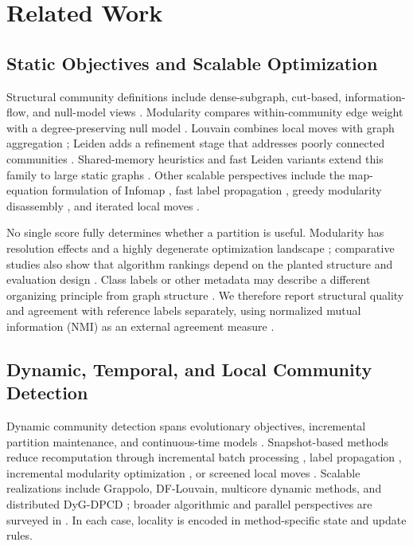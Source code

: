 \documentclass{ieeeaccess}
\begin{document}
\section{Related Work}
\label{sec:related}

\subsection{Static Objectives and Scalable Optimization}

Structural community definitions include dense-subgraph, cut-based,
information-flow, and null-model views \cite{Porter2009,Fortunato2010,
Radicchi2004}. Modularity compares within-community edge weight with a
degree-preserving null model \cite{Newman2004,Brandes2008}. Louvain combines
local moves with graph aggregation \cite{Blondel2008}; Leiden adds a refinement
stage that addresses poorly connected communities \cite{Traag2019}.
Shared-memory heuristics and fast Leiden variants extend this family to large static
graphs \cite{Lu2015,Sahu2024FastLeiden}. Other scalable perspectives include
the map-equation formulation of Infomap \cite{Rosvall2007}, fast label
propagation \cite{Traag2023LabelPropagation}, greedy modularity disassembly
\cite{Rustamaji2024}, and iterated local moves \cite{Taibi2025FLMIG}.

No single score fully determines whether a partition is useful. Modularity has
resolution effects and a highly degenerate optimization landscape
\cite{Good2010,Fortunato2016}; comparative studies also show that algorithm
rankings depend on the planted structure and evaluation design
\cite{Yang2016Comparative}. Class labels or other metadata may describe a
different organizing principle from graph structure
\cite{Yang2015GroundTruth,Peel2017}. We therefore report structural quality and
agreement with reference labels separately, using normalized mutual information
(NMI) as an external agreement measure \cite{Danon2005}.

\subsection{Dynamic, Temporal, and Local Community Detection}

Dynamic community detection spans evolutionary objectives, incremental
partition maintenance, and continuous-time models \cite{Rossetti2018}.
Snapshot-based methods reduce recomputation through incremental batch
processing \cite{Chong2013}, label propagation
\cite{Shang2014Realtime,Ma2020IncrementalLP,Seifikar2020,Xie2013LabelRankT,
Han2017AdaptiveLP}, incremental modularity optimization
\cite{Zhuang2021DynaMo}, or screened local moves
\cite{Zarayeneh2021DeltaScreening}. Scalable realizations include Grappolo,
DF-Louvain, multicore dynamic methods, and distributed DyG-DPCD
\cite{Halappanavar2017,Sahu2024DFLouvain,Sahu2025Dynamic,Sattar2025DyGDPCD};
broader algorithmic and parallel perspectives are surveyed in
\cite{Sattar2023,Hanauer2022DynamicGraphs}. In each case, locality is encoded in
method-specific state and update rules.
\end{document}
